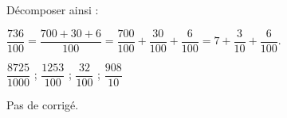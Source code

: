\begin{exercice*}
    Décomposer ainsi : 
    
    $\dfrac{736}{100} = \dfrac{700 + 30 + 6}{100} = \dfrac{700}{100} + \dfrac{30}{100} + \dfrac{6}{100} = 7+\dfrac{3}{10}+\dfrac{6}{100}$.
    \begin{center}
       $\dfrac{\num{8725}}{\num{1000}}$ \; ; \; $\dfrac{\num{1253}}{100}$ \; ; \; $\dfrac{32}{100}$ \; ; \; $\dfrac{908}{10}$
    \end{center}
 \end{exercice*}
\begin{corrige}
  Pas de corrigé.
\end{corrige}

